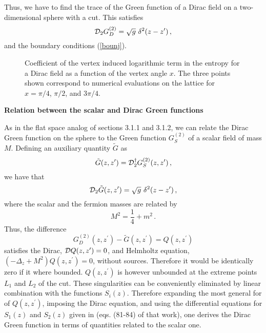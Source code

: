 \documentclass[a4paper]{article}
\begin{document}
Thus, we have to find the trace of the Green function of a Dirac field on a two-dimensional sphere with a cut. This  
satisfies
\begin{equation}
{\cal D}_2 G_D^{(2)} =\sqrt{g}\, \,\delta^2(z-z^\prime)\,,
\end{equation}
and the boundary conditions (\ref{bounj}).


 \begin{figure} [tb]
\centering
\leavevmode
\epsfysize=5.3cm
\bigskip
{}
\caption{Coefficient of the vertex induced logarithmic term in the entropy for a Dirac field as a function of the vertex angle $x$. The three points shown correspond to numerical evaluations on the lattice for $x=\pi/4$, $\pi/2$, and $3 \pi/4$.}
\label{ryo}
\end{figure}
 

\smallskip

\noindent\textbf{Relation between the scalar and Dirac Green functions}

\noindent As in the flat space analog of sections 3.1.1 and 3.1.2, we can relate the Dirac Green function on the sphere to the Green function $G_S^{(2)}$ of a scalar field of mass $M$.  Defining an auxiliary quantity $\tilde{G}$ as
\begin{equation}
\tilde{G}(z,z^\prime)={\cal D}^\dagger_2 G_S^{(2)}(z,z^\prime)\,,
\end{equation}
we have that 
\begin{equation}
{\cal D}_2 \tilde{G}(z,z^\prime) =\sqrt{g}\, \,\delta^2(z-z^\prime)\,,
\end{equation}
where the scalar and the fermion masses are related by
\begin{equation}
M^2=\frac{1}{4}+m^2\,.
\end{equation}
Thus, the difference \begin{equation}
G_D^{(2)}(z,z^\prime)-\tilde{G}(z,z^\prime)=Q(z,z^\prime)
\end{equation}
 satisfies the Dirac, $
{\cal D} Q(z,z^\prime)=0$, 
 and Helmholtz equation, $(-\Delta_{z}+M^2)Q(z,z^\prime)=0$, without sources.  Therefore it would be identically zero if it where bounded. $Q(z,z^\prime)$ is however unbounded at the extreme points $L_1$ and $L_2$ of the cut. These singularities can be conveniently eliminated by linear combination with the functions $S_i(z)$. Therefore expanding the most general for of $
Q(z,z^\prime)$, imposing the Dirac equation, and using the differential equations for $S_1(z)$ and $S_2(z)$ given in \cite{log} (eqs. (81-84) of that work), one derives the Dirac Green function in terms of quantities related to the scalar one. 
 
\end{document}
